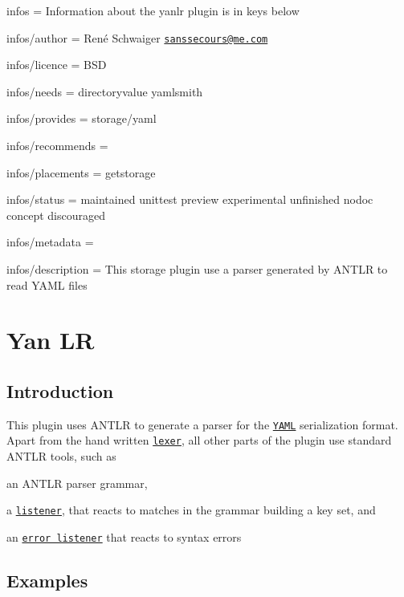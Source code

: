 
\begin{DoxyItemize}
\item infos = Information about the yanlr plugin is in keys below
\item infos/author = René Schwaiger \href{mailto:sanssecours@me.com}{\tt sanssecours@me.\+com}
\item infos/licence = B\+SD
\item infos/needs = directoryvalue yamlsmith
\item infos/provides = storage/yaml
\item infos/recommends =
\item infos/placements = getstorage
\item infos/status = maintained unittest preview experimental unfinished nodoc concept discouraged
\item infos/metadata =
\item infos/description = This storage plugin use a parser generated by A\+N\+T\+LR to read Y\+A\+ML files
\end{DoxyItemize}\hypertarget{md_src_plugins_yanlr_README_src_plugins_yanlr_README_md}{}\section{Yan LR}\label{md_src_plugins_yanlr_README_src_plugins_yanlr_README_md}
\subsection*{Introduction}

This plugin uses A\+N\+T\+LR to generate a parser for the \href{http://yaml.org}{\tt Y\+A\+ML} serialization format. Apart from the hand written \href{/home/markus/Projekte/Elektra/current/src/plugins/yanlr/yaml_lexer.cpp}{\tt lexer}, all other parts of the plugin use standard A\+N\+T\+LR tools, such as


\begin{DoxyItemize}
\item an A\+N\+T\+LR parser grammar,
\item a \href{/home/markus/Projekte/Elektra/current/src/plugins/yanlr/listener.cpp}{\tt listener}, that reacts to matches in the grammar building a key set, and
\item an \href{/home/markus/Projekte/Elektra/current/src/plugins/yanlr/error_listener.cpp}{\tt error listener} that reacts to syntax errors
\end{DoxyItemize}

\subsection*{Examples}

